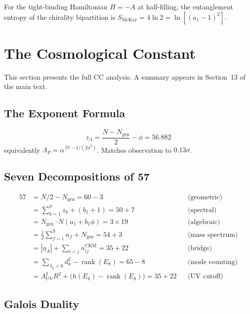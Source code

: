 \documentclass[12pt,a4paper]{article}
\theoremstyle{definition}
\begin{document}
For the tight-binding Hamiltonian $H = -A$ at half-filling, the entanglement entropy of the chirality bipartition is $S_{\text{McKay}} = 4\ln 2 = \ln[(a_1 - 1)^2]$.


\section{The Cosmological Constant}
\label{sec:S-cc}

This section presents the full CC analysis.  A summary appears in Section~13 of the main text.

\subsection{The Exponent Formula}

\begin{equation}
z_\Lambda = \frac{N - N_{\text{gen}}}{2} - \phi = 56.882
\end{equation}
equivalently $\Lambda_P = \alpha^{\,57 - 1/(2\phi^3)}$.  Matches observation to $0.13\sigma$.

\subsection{Seven Decompositions of 57}

\begin{align}
57 &= N/2 - N_{\text{gen}} = 60 - 3 && \text{(geometric)} \\
   &= \textstyle\sum_{k=1}^{9} z_k + (b_1 + 1) = 50 + 7 && \text{(spectral)} \\
   &= N_{\text{gen}} \cdot N(a_1 + b_1\phi) = 3 \times 19 && \text{(algebraic)} \\
   &= \tfrac{1}{2}\textstyle\sum_{f=1}^{9} n_f + N_{\text{gen}} = 54 + 3 && \text{(mass spectrum)} \\
   &= |\eta_A| + \textstyle\sum_{i<j} n_{ij}^{\text{CKM}} = 35 + 22 && \text{(bridge)} \\
   &= \textstyle\sum_{\lambda_k<0} d_k^2 - \operatorname{rank}(E_8) = 65 - 8 && \text{(mode counting)} \\
   &= \Lambda_{\mathrm{UV}}^2 R^2 + \bigl(h(E_8) - \operatorname{rank}(E_8)\bigr) = 35 + 22 && \text{(UV cutoff)}
\end{align}

\subsection{Galois Duality}
\end{document}
